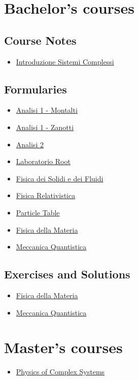 \documentclass{article}
\begin{document}
\section{Bachelor's courses}

\subsection{Course Notes}

    \begin{itemize}
        \item \href{b_introduzione_sistemi_complessi.html}{Introduzione Sistemi Complessi}
    \end{itemize}

\subsection{Formularies}

    \begin{itemize}
        \item \href{b_formulario_analisi_1_mon.html}{Analisi 1 - Montalti}
        \item \href{b_formulario_analisi_1_zan.html}{Analisi 1 - Zanotti}
        \item \href{b_formulario_analisi_2.html}{Analisi 2}
        \item \href{b_formulario_laboratorio_root.html}{Laboratorio Root}
        \item \href{b_formulario_fisica_dei_solidi_e_dei_fluidi.html}{Fisica dei Solidi e dei Fluidi}
        \item \href{b_formulario_fisica_relativistica.html}{Fisica Relativistica}
        \item \href{b_formulario_particle_table.html}{Particle Table}
        \item \href{b_formulario_materia.html}{Fisica della Materia}
        \item \href{b_formulario_meccanica_quantistica.html}{Meccanica Quantistica}
    \end{itemize}

\subsection{Exercises and Solutions}

    \begin{itemize}
        \item \href{b_exercises_soluzioni_materia.html}{Fisica della Materia}
        \item \href{b_exercises_soluzioni_meccanica_quantistica.html}{Meccanica Quantistica}
    \end{itemize}

\section{Master's courses}
    \begin{itemize}
        \item \href{m_physics_of_complex_systems.html}{Physics of Complex Systems}
    \end{itemize}
\end{document}
